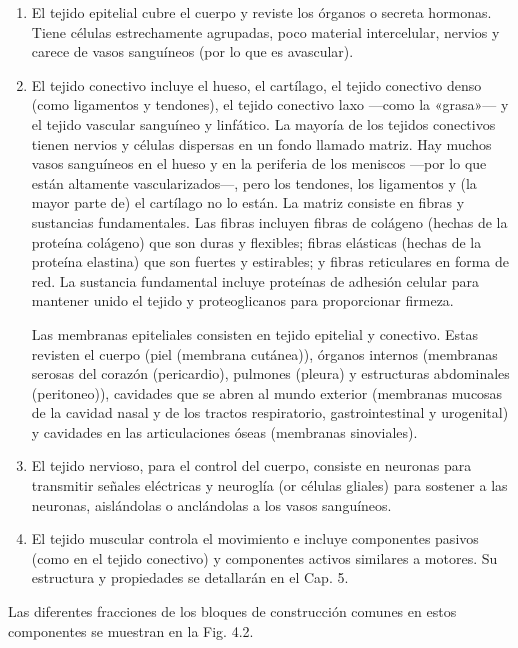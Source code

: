 \documentclass[12pt]{book}
\begin{document}
\begin{enumerate}
    \item[1.] El tejido epitelial cubre el cuerpo y reviste los órganos o secreta hormonas. Tiene células estrechamente agrupadas, poco material intercelular, nervios y carece de vasos sanguíneos (por lo que es avascular).
    
    \item[2.] El tejido conectivo incluye el hueso, el cartílago, el tejido conectivo denso (como ligamentos y tendones), el tejido conectivo laxo ---como la «grasa»--- y el tejido vascular sanguíneo y linfático. La mayoría de los tejidos conectivos tienen nervios y células dispersas en un fondo llamado matriz. Hay muchos vasos sanguíneos en el hueso y en la periferia de los meniscos ---por lo que están altamente vascularizados---, pero los tendones, los ligamentos y (la mayor parte de) el cartílago no lo están. La matriz consiste en fibras y sustancias fundamentales. Las fibras incluyen fibras de colágeno (hechas de la proteína colágeno) que son duras y flexibles; fibras elásticas (hechas de la proteína elastina) que son fuertes y estirables; y fibras reticulares en forma de red. La sustancia fundamental incluye proteínas de adhesión celular para mantener unido el tejido y proteoglicanos para proporcionar firmeza.
    
    Las membranas epiteliales consisten en tejido epitelial y conectivo. Estas revisten el cuerpo (piel (membrana cutánea)), órganos internos (membranas serosas del corazón (pericardio), pulmones (pleura) y estructuras abdominales (peritoneo)), cavidades que se abren al mundo exterior (membranas mucosas de la cavidad nasal y de los tractos respiratorio, gastrointestinal y urogenital) y cavidades en las articulaciones óseas (membranas sinoviales).
    
    \item[3.] El tejido nervioso, para el control del cuerpo, consiste en neuronas para transmitir señales eléctricas y neuroglía (or células gliales) para sostener a las neuronas, aislándolas o anclándolas a los vasos sanguíneos.
    
    \item[4.] El tejido muscular controla el movimiento e incluye componentes pasivos (como en el tejido conectivo) y componentes activos similares a motores. Su estructura y propiedades se detallarán en el Cap. 5.
\end{enumerate}

Las diferentes fracciones de los bloques de construcción comunes en estos componentes se muestran en la Fig. 4.2.
\end{document}
